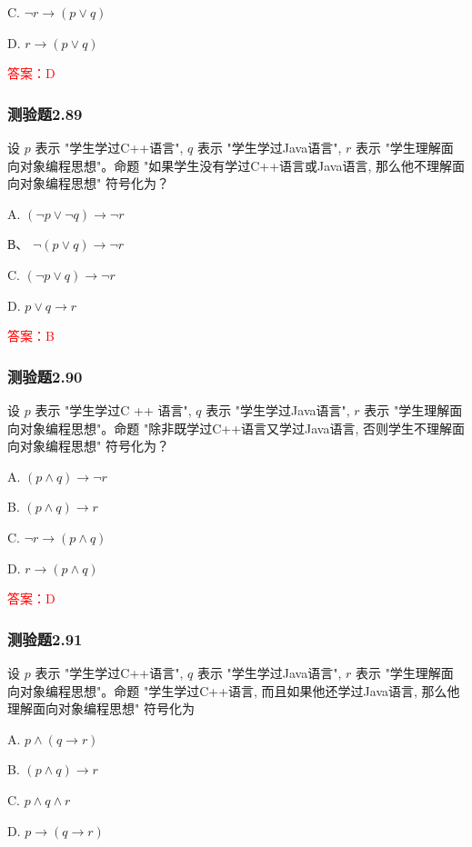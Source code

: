 \documentclass[UTF8, heading=true]{ctexart}
\begin{document}
C. $
\neg r \rightarrow(p \vee q)
$

D. $
r \rightarrow(p \vee q)
$

\textcolor{red}{答案：D}


\subsubsection{测验题2.89}

设 $p$ 表示 "学生学过C++语言", $q$ 表示 "学生学过Java语言", $r$ 表示
 "学生理解面向对象编程思想"。命题 "如果学生没有学过C++语言或Java语言, 
 那么他不理解面向对象编程思想" 符号化为？

A. $(\neg p \vee \neg q) \rightarrow \neg r$

В、 $\neg(p \vee q) \rightarrow \neg r$

C. $(\neg p \vee q) \rightarrow \neg r$

D. $ p \vee q \rightarrow r$

\textcolor{red}{答案：B}

\subsubsection{测验题2.90}

设 $p$ 表示 "学生学过C ++ 语言", $q$ 表示 "学生学过Java语言", $r$ 表示 
"学生理解面向对象编程思想"。命题 "除非既学过C++语言又学过Java语言, 
否则学生不理解面向对象编程思想" 符号化为？

A. $(p \wedge q) \rightarrow \neg r$

B. $(p \wedge q) \rightarrow r$

C. $ \neg r \rightarrow(p \wedge q)$

D. $ r \rightarrow(p \wedge q)$

\textcolor{red}{答案：D}

\subsubsection{测验题2.91}

设 $p$ 表示 "学生学过C++语言", $q$ 表示 "学生学过Java语言", $r$ 表示 
"学生理解面向对象编程思想"。命题 "学生学过C++语言, 而且如果他还学过Java语言, 
那么他理解面向对象编程思想" 符号化为 $\qquad$

A. $p \wedge(q \rightarrow r)$

B. $(p \wedge q) \rightarrow r$

C. $p \wedge q \wedge r$

D. $p \rightarrow(q \rightarrow r)$
\end{document}
